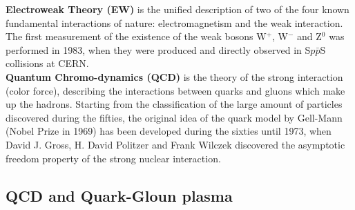 \textbf{Electroweak Theory (EW)} is the unified description of two of the four known fundamental interactions of nature: electromagnetism and the weak interaction. The first measurement of the existence of the weak bosons W$^{+}$, W$^{-}$ and Z$^{0}$ was performed in 1983, when they were produced and directly observed in S$p\bar{p}$S collisions at CERN.\\

\textbf{Quantum Chromo-dynamics (QCD)} is the theory of the strong interaction (color force), describing the interactions between quarks and gluons which make up the hadrons. Starting from the classification of the large amount of particles discovered during the fifties, the original idea of the quark model by Gell-Mann (Nobel Prize in 1969) has been developed during the sixties until 1973, when David J. Gross, H. David Politzer and Frank Wilczek discovered the asymptotic freedom property of the strong nuclear interaction.

\subsection{QCD and Quark-Gloun plasma}\label{label:qcd}
            

